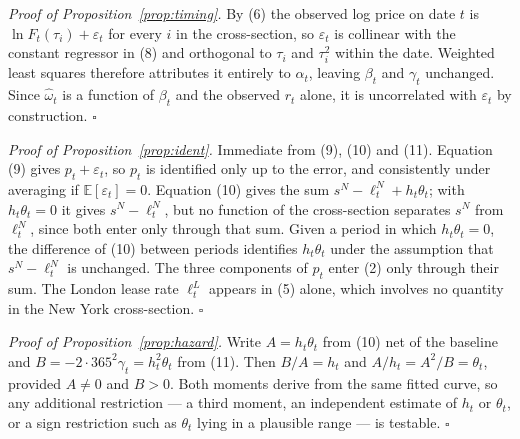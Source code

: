 \documentclass[11pt,a4paper]{article}
\newenvironment{proof}[1][Proof]
  {\par\medskip\noindent\textit{#1.}\space}
  {\hfill$\square$\par\medskip}
\newcommand{\sN}{s^{N}}
\newcommand{\lN}{\ell^{N}_{t}}
\newcommand{\lL}{\ell^{L}_{t}}
\begin{document}
\begin{proof}[Proof of Proposition~\ref{prop:timing}]
By (6) the observed log price on date $t$ is $\ln F_t(\tau_i)+\varepsilon_t$
for every $i$ in the cross-section, so $\varepsilon_t$ is collinear with the
constant regressor in (8) and orthogonal to $\tau_i$ and $\tau_i^{2}$ within
the date. Weighted least squares therefore attributes it entirely to
$\alpha_t$, leaving $\beta_t$ and $\gamma_t$ unchanged. Since $\hat{\omega}_t$
is a function of $\beta_t$ and the observed $r_t$ alone, it is uncorrelated
with $\varepsilon_t$ by construction.
\end{proof}

\begin{proof}[Proof of Proposition~\ref{prop:ident}]
Immediate from (9), (10) and (11). Equation (9) gives $p_t+\varepsilon_t$, so
$p_t$ is identified only up to the error, and consistently under averaging if
$\mathbb{E}[\varepsilon_t]=0$. Equation (10) gives the sum
$\sN-\lN+h_t\theta_t$; with $h_t\theta_t=0$ it gives $\sN-\lN$, but no function
of the cross-section separates $\sN$ from $\lN$, since both enter only through
that sum. Given a period in which $h_t\theta_t=0$, the difference of (10)
between periods identifies $h_t\theta_t$ under the assumption that $\sN-\lN$ is
unchanged. The three components of $p_t$ enter (2) only through their sum. The
London lease rate $\lL$ appears in (5) alone, which involves no quantity in the
New York cross-section.
\end{proof}

\begin{proof}[Proof of Proposition~\ref{prop:hazard}]
Write $A=h_t\theta_t$ from (10) net of the baseline and
$B=-2\cdot365^{2}\gamma_t=h_t^{2}\theta_t$ from (11). Then $B/A=h_t$ and
$A/h_t=A^{2}/B=\theta_t$, provided $A\neq0$ and $B>0$. Both moments derive from
the same fitted curve, so any additional restriction --- a third moment, an
independent estimate of $h_t$ or $\theta_t$, or a sign restriction such as
$\theta_t$ lying in a plausible range --- is testable.
\end{proof}
\end{document}
